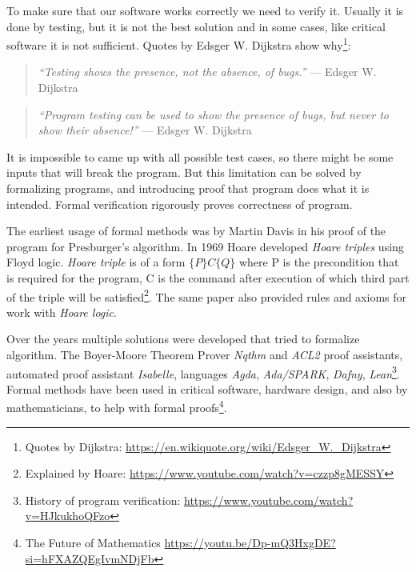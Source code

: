 To make sure that our software works correctly we need to verify it. Usually it is done by testing, but it is not the best solution and in some cases, like critical software it is not sufficient. Quotes by Edsger W. Dijkstra show why\footnote{Quotes by Dijkstra: \url{https://en.wikiquote.org/wiki/Edsger\_W.\_Dijkstra}}:

\begin{quote}
\textit{``Testing shows the presence, not the absence, of bugs.''} --- Edsger W. Dijkstra \cite{buxton1970software}
\end{quote}

\begin{quote}
\textit{``Program testing can be used to show the presence of bugs, but never to show their absence!''} --- Edsger W. Dijkstra \cite{Dijkstra1970}
\end{quote}

It is impossible to came up with all possible test cases, so there might be some inputs that will break the program. But this limitation can be solved by formalizing programs, and introducing proof that program does what it is intended.
Formal verification rigorously proves correctness of program.


The earliest usage of formal methods was by Martin Davis\cite{Davis1957, Davis2002, Mol2025} in his proof of the program for Presburger's algorithm\cite{Presburger1929}.
In 1969 Hoare developed \textit{Hoare triples}\cite{Hoare1969} using Floyd logic\cite{Floyd1967}. \textit{Hoare triple} is of a form $\{P\} C \{Q\}$ where P is the precondition that is required for the program, C is the command after execution of which third part of the triple will be satisfied\footnote{Explained by Hoare: \url{https://www.youtube.com/watch?v=czzp8gMESSY}}. The same paper also provided rules and axioms for work with \textit{Hoare logic}.

Over the years multiple solutions were developed that tried to formalize algorithm. The Boyer-Moore Theorem Prover \textit{Nqthm}\cite{Boyer1992} and \textit{ACL2} proof assistants, automated proof assistant \textit{Isabelle}, languages \textit{Agda}, \textit{Ada/SPARK}, \textit{Dafny}\cite{Leino2010}, \textit{Lean}\footnote{History of program verification: \url{https://www.youtube.com/watch?v=HJkukhoQFzo}}. Formal methods have been used in critical software, hardware design, and also by mathematicians, to help with formal proofs\footnote{The Future of Mathematics \url{https://youtu.be/Dp-mQ3HxgDE?si=hFXAZQEgIvmNDjFb}}.
